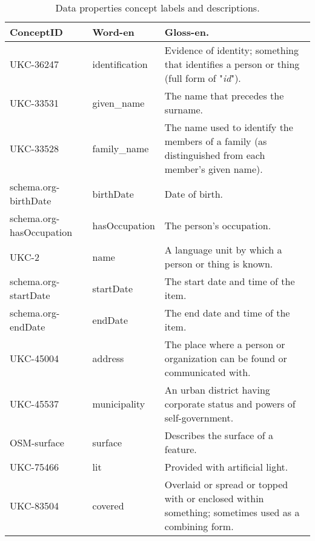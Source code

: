 \begin{table}[H]
    \centering
    \renewcommand{\arraystretch}{1.5} %
    \begin{tabularx}{\textwidth}{|M{3cm}|M{3cm}|X|}
        \hline
        \textbf{ConceptID} & \textbf{Word-en} & \textbf{Gloss-en}.\\ \hline
        UKC-36247 & identification & Evidence of identity; something that identifies a person or thing (full form of "\textit{id}").\\ \hline
        UKC-33531 & given\_name & The name that precedes the surname.\\ \hline
        UKC-33528 & family\_name & The name used to identify the members of a family (as distinguished from each member's given name).\\ \hline
        schema.org-birthDate & birthDate & Date of birth.\\ \hline
        schema.org-hasOccupation & hasOccupation & The person's occupation.\\ \hline
        UKC-2 & name & A language unit by which a person or thing is known.\\ \hline
        schema.org-startDate & startDate & The start date and time of the item.\\ \hline
        schema.org-endDate & endDate & The end date and time of the item.\\ \hline
        UKC-45004 & address & The place where a person or organization can be found or communicated with.\\ \hline
        UKC-45537 & municipality & An urban district having corporate status and powers of self-government.\\ \hline
        OSM-surface & surface & Describes the surface of a feature.\\ \hline
        UKC-75466 & lit & Provided with artificial light.\\ \hline
        UKC-83504 & covered & Overlaid or spread or topped with or enclosed within something; sometimes used as a combining form.\\ \hline
    \end{tabularx}
    \caption{Data properties concept labels and descriptions.}
    \label{tab:table3}
\end{table}



